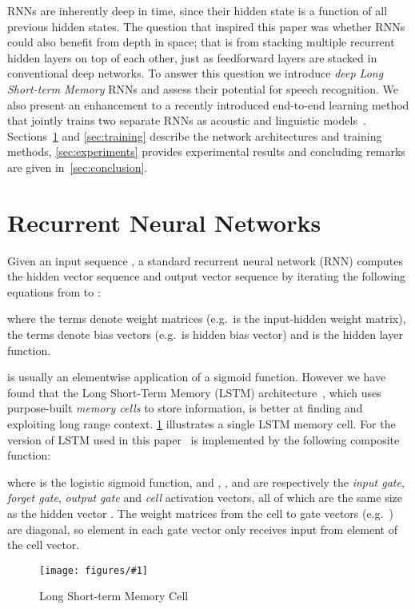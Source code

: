 \documentclass{article}
\newcommand{\eg}{e.g.\ }
\newcommand{\flabel}[1]{\label{fig:#1}}
\newcommand{\fref}[1]{\cref{fig:#1}}
\newcommand{\sref}[1]{\cref{sec:#1}}
\newcommand{\capt}[2]{\caption[#1]{#1#2}}
\newcommand{\figt}[5]
{
\begin{figure}[t]
\begin{center}
\texttt{[image: figures/\#1]}
\end{center}
\capt{#4}{#5}
\flabel{#2}
\end{figure}
}
\begin{document}
RNNs are inherently deep in time, since their hidden state is a function of all previous hidden states.
The question that inspired this paper was whether RNNs could also benefit from depth in space; that is from stacking multiple recurrent hidden layers on top of each other, just as feedforward layers are stacked in conventional deep networks.
To answer this question we introduce \emph{deep Long Short-term Memory} RNNs and assess their potential for speech recognition.
We also present an enhancement to a recently introduced end-to-end learning method that jointly trains two separate RNNs as acoustic and linguistic models~\cite{graves12transducer}.
Sections~\ref{sec:rnn} and \ref{sec:training} describe the network architectures and training methods, \sref{experiments} provides experimental results and concluding remarks are given in~\sref{conclusion}.


\section{Recurrent Neural Networks}
\label{sec:rnn}

Given an input sequence , a standard recurrent neural network (RNN) computes the hidden vector sequence  and output vector sequence  by iterating the following equations from  to :
 
where the  terms denote weight matrices (\eg  is the input-hidden weight matrix), the  terms denote bias vectors (\eg  is hidden bias vector) and  is the hidden layer function.



 is usually an elementwise application of a sigmoid function.
However we have found that the Long Short-Term Memory (LSTM) architecture~\cite{hochreiter97lstm}, which uses purpose-built \emph{memory cells} to store information, is better at finding and exploiting long range context.
\fref{lstm} illustrates a single LSTM memory cell.
For the version of LSTM used in this paper~\cite{gers02peeps}  is implemented by the following composite function:

where  is the logistic sigmoid function, and , ,  and  are respectively the \emph{input gate}, \emph{forget gate}, \emph{output gate} and \emph{cell} activation vectors, all of which are the same size as the hidden vector .
The weight matrices from the cell to gate vectors (\eg ) are diagonal, so element  in each gate vector only receives input from element  of the cell vector.

\figt{lstm_variables}{lstm}{0.85}{Long Short-term Memory Cell}{}
\end{document}
